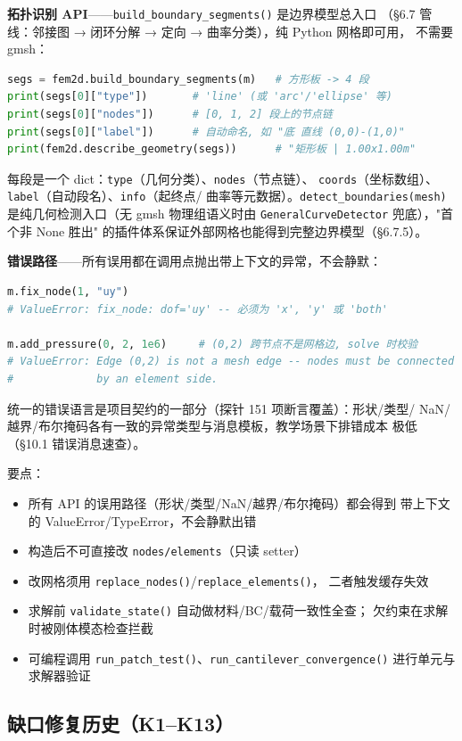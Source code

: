 \documentclass[12pt,a4paper]{ctexart}
\newcommand{\fem}{\Verb}
\begin{document}
\textbf{拓扑识别 API}——\fem|build_boundary_segments()| 是边界模型总入口
（§6.7 管线：邻接图 → 闭环分解 → 定向 → 曲率分类），纯 Python 网格即可用，
不需要 gmsh：
\begin{lstlisting}[language=python]
segs = fem2d.build_boundary_segments(m)   # 方形板 -> 4 段
print(segs[0]["type"])       # 'line' (或 'arc'/'ellipse' 等)
print(segs[0]["nodes"])      # [0, 1, 2] 段上的节点链
print(segs[0]["label"])      # 自动命名, 如 "底 直线 (0,0)-(1,0)"
print(fem2d.describe_geometry(segs))      # "矩形板 | 1.00x1.00m"
\end{lstlisting}
每段是一个 dict：\fem|type|（几何分类）、\fem|nodes|（节点链）、
\fem|coords|（坐标数组）、\fem|label|（自动段名）、\fem|info|（起终点/
曲率等元数据）。\fem|detect_boundaries(mesh)| 是纯几何检测入口（无 gmsh
物理组语义时由 \fem|GeneralCurveDetector| 兜底），"首个非 None 胜出"
的插件体系保证外部网格也能得到完整边界模型（§6.7.5）。

\textbf{错误路径}——所有误用都在调用点抛出带上下文的异常，不会静默：
\begin{lstlisting}[language=python]
m.fix_node(1, "uy")
# ValueError: fix_node: dof='uy' -- 必须为 'x', 'y' 或 'both'

m.add_pressure(0, 2, 1e6)     # (0,2) 跨节点不是网格边, solve 时校验
# ValueError: Edge (0,2) is not a mesh edge -- nodes must be connected
#             by an element side.
\end{lstlisting}
统一的错误语言是项目契约的一部分（探针 151 项断言覆盖）：形状/类型/
NaN/越界/布尔掩码各有一致的异常类型与消息模板，教学场景下排错成本
极低（§10.1 错误消息速查）。

要点：
\begin{itemize}[leftmargin=*]
  \item 所有 API 的误用路径（形状/类型/NaN/越界/布尔掩码）都会得到
        带上下文的 ValueError/TypeError，不会静默出错
  \item 构造后不可直接改 \fem|nodes/elements|（只读 setter）
  \item 改网格须用 \fem|replace_nodes()|/\fem|replace_elements()|，
        二者触发缓存失效
  \item 求解前 \fem|validate_state()| 自动做材料/BC/载荷一致性全查；
        欠约束在求解时被刚体模态检查拦截
  \item 可编程调用 \fem|run_patch_test()|、\fem|run_cantilever_convergence()|
        进行单元与求解器验证
\end{itemize}

\subsection{缺口修复历史（K1--K13）}
\end{document}
